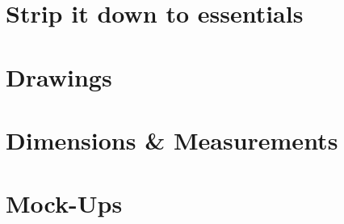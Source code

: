 \section{Strip it down to essentials}\label{sec:design-essentials}


\section{Drawings}\label{sec:drawings}


\section{Dimensions \& Measurements}\label{design-dimensions}


\section{Mock-Ups}\label{sec:design-mockups}
